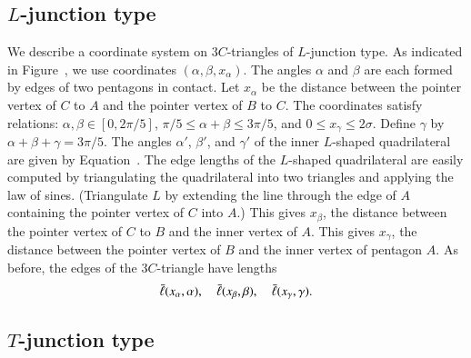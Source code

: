 \subsection{$L$-junction type}

We describe a coordinate system on $3C$-triangles of $L$-junction
type.  As indicated in Figure~, we use coordinates
$(\alpha,\beta,x_\alpha)$.  The angles $\alpha$ and $\beta$ are each
formed by edges of two pentagons in contact.  Let $x_\alpha$ be the
distance between the pointer vertex of $C$ to $A$ and the pointer
vertex of $B$ to $C$.  The coordinates satisfy relations:
$\alpha,\beta\in [0,2\pi/5]$, $\pi/5\le\alpha+\beta\le 3\pi/5$, and
$0\le x_\gamma\le 2\sigma$.  Define $\gamma$ by
$\alpha+\beta+\gamma=3\pi/5$.  The angles $\alpha'$, $\beta'$, and
$\gamma'$ of the inner $L$-shaped quadrilateral are given by
Equation~.  The edge lengths of the $L$-shaped
quadrilateral are easily computed by triangulating the quadrilateral
into two triangles and applying the law of sines.  (Triangulate
$L$ by extending the line through the edge of $A$ containing the
pointer vertex of $C$ into $A$.)  This gives
$x_\beta$, the distance between the pointer vertex of $C$ to $B$ and
the inner vertex of $A$.  This gives $x_\gamma$, the distance between
the pointer vertex of $B$ and the inner vertex of pentagon $A$.
As before, the edges of the $3C$-triangle have lengths
\[
\bar\ell(x_\alpha,\alpha),\quad \bar\ell(x_\beta,\beta),\quad \bar\ell(x_\gamma,\gamma).
\]



\subsection{$T$-junction type}

